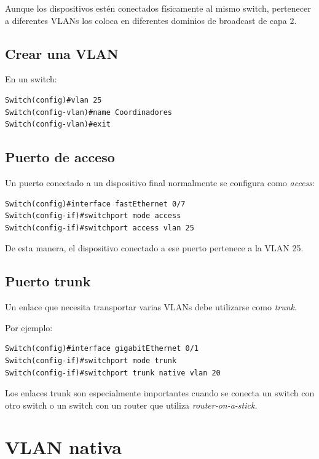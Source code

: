 \documentclass[12pt]{article}
\begin{document}
Aunque los dispositivos estén conectados físicamente al mismo switch,
pertenecer a diferentes VLANs los coloca en diferentes dominios de
broadcast de capa 2.


\subsection{Crear una VLAN}

En un switch:

\begin{lstlisting}
Switch(config)#vlan 25
Switch(config-vlan)#name Coordinadores
Switch(config-vlan)#exit
\end{lstlisting}


\subsection{Puerto de acceso}

Un puerto conectado a un dispositivo final normalmente se configura como
\textit{access}:

\begin{lstlisting}
Switch(config)#interface fastEthernet 0/7
Switch(config-if)#switchport mode access
Switch(config-if)#switchport access vlan 25
\end{lstlisting}

De esta manera, el dispositivo conectado a ese puerto pertenece a la
VLAN 25.


\subsection{Puerto trunk}

Un enlace que necesita transportar varias VLANs debe utilizarse como
\textit{trunk}.

Por ejemplo:

\begin{lstlisting}
Switch(config)#interface gigabitEthernet 0/1
Switch(config-if)#switchport mode trunk
Switch(config-if)#switchport trunk native vlan 20
\end{lstlisting}

Los enlaces trunk son especialmente importantes cuando se conecta un switch
con otro switch o un switch con un router que utiliza
\textit{router-on-a-stick}.


\section{VLAN nativa}
\end{document}
